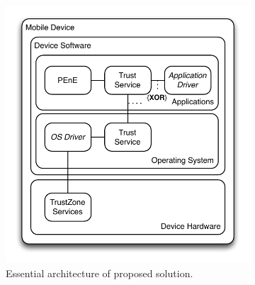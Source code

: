 \documentclass[10pt,letterpaper]{article}
\begin{document}
\begin{figure}
\centering
\begin{subfigure}[b]{0.45\textwidth}
\centering
\includegraphics[width=\textwidth]{./images/hla.pdf}
\caption{Essential architecture of proposed solution.}
\label{fig:hla}
\end{subfigure}%
\begin{subfigure}[b]{0.45\textwidth}
\centering

\end{subfigure}
\end{figure}
\end{document}
